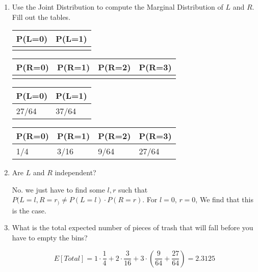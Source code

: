 \begin{enumerate}
\item Use the Joint Distribution to compute the Marginal Distribution of $L$ and $R$. Fill out the tables.
\begin{center}
\begin{tabular}{|l|l|}
\hline
P(L=0) & P(L=1) \\ \hline
       &        \\ \hline
\end{tabular}
\begin{tabular}{|l|l|l|l|}
\hline
P(R=0) & P(R=1) & P(R=2) & P(R=3) \\ \hline
       &        &        &        \\ \hline
\end{tabular}
\end{center}
\begin{solution}[.75 cm]
\begin{center}
\begin{tabular}{|l|l|}
\hline
P(L=0) & P(L=1) \\ \hline
   27/64    &    37/64    \\ \hline
\end{tabular}
\end{center}
\begin{center}
\begin{tabular}{|l|l|l|l|}
\hline
P(R=0) & P(R=1) & P(R=2) & P(R=3) \\ \hline
   1/4    &  3/16      &  9/64      &     27/64   \\ \hline
\end{tabular}
\end{center}
\end{solution}
\item Are $L$ and $R$ independent?\\
\begin{solution}[3 mm]
No. we just have to find some $l,r$ such that $P(L=l, R=r_) \neq P(L=l)\cdot P(R=r).$ For $l = 0$, $r = 0$, We find that this is the case.
\end{solution}
\item What is the total expected number of pieces of trash that will fall before you have to empty the bins?
\begin{solution}[1 cm]
\[E[Total] = 1\cdot\frac{1}{4} + 2\cdot\frac{3}{16} + 3\cdot(\frac{9}{64} + \frac{27}{64}) = 2.3125\]
\end{solution}
\end{enumerate}

